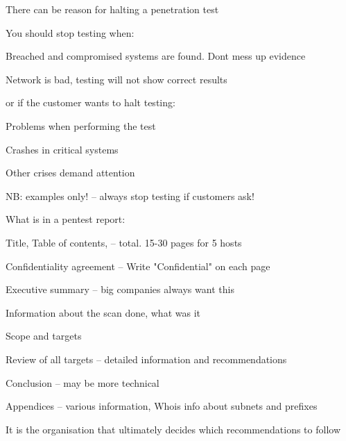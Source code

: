 \documentclass[Screen16to9,17pt]{foils}
\begin{document}

\begin{list1}
\item There can be reason for halting a penetration test
\item You should stop testing when:
\begin{list2}
\item Breached and compromised systems are found. Dont mess up evidence
\item Network is bad, testing will not show correct results
\end{list2}
\item or if the customer wants to halt testing:
\begin{list2}
\item Problems when performing the test
\item Crashes in critical systems
\item Other crises demand attention
\end{list2}
\item NB: examples only! -- always stop testing if customers ask!
\end{list1}



\begin{list1}
\item What is in a pentest report:
\begin{list2}
\item Title, Table of contents, -- total. 15-30 pages for 5 hosts
\item Confidentiality agreement -- Write "Confidential" on each page
\item Executive summary -- big companies always want this
\item Information about the scan done, what was it
\item Scope and targets
\item Review of all targets -- detailed information and recommendations
\item Conclusion -- may be more technical
\item Appendices -- various information, Whois info about subnets and prefixes
\end{list2}
\item It is the organisation that ultimately decides which recommendations to follow
\end{list1}


\end{document}
